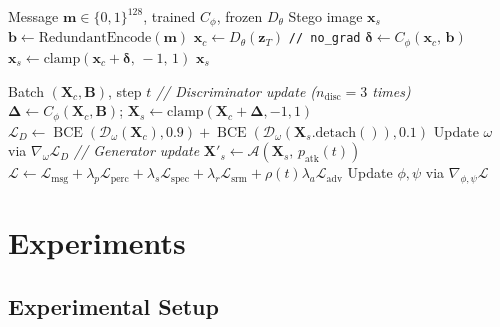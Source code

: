 \documentclass[journal]{IEEEtran}
\newcommand{\Lcal}{\mathcal{L}}
\DeclareMathOperator{\BCE}{BCE}
\begin{document}
\begin{algorithm}[t]
\caption{DSCSP-CA Encoding}
\label{alg:encoding}
\begin{algorithmic}[1]
\REQUIRE Message $\mathbf{m}\!\in\!\{0,1\}^{128}$, trained $C_\phi$, frozen $D_\theta$
\ENSURE Stego image $\mathbf{x}_s$
\STATE $\mathbf{b} \leftarrow \mathrm{RedundantEncode}(\mathbf{m})$
\STATE $\mathbf{x}_c \leftarrow D_\theta(\mathbf{z}_T)$ \quad \texttt{// no\_grad}
\STATE $\bm{\delta} \leftarrow C_\phi(\mathbf{x}_c,\,\mathbf{b})$
\STATE $\mathbf{x}_s \leftarrow \mathrm{clamp}(\mathbf{x}_c + \bm{\delta},\,-1,\,1)$
\RETURN $\mathbf{x}_s$
\end{algorithmic}
\end{algorithm}

\begin{algorithm}[t]
\caption{DSCSP-CA Training Step (Phase 1)}
\label{alg:training}
\begin{algorithmic}[1]
\REQUIRE Batch $(\mathbf{X}_c,\mathbf{B})$, step $t$
\STATE \textit{// Discriminator update ($n_\text{disc}=3$ times)}
    \STATE $\bm{\Delta} \leftarrow C_\phi(\mathbf{X}_c,\mathbf{B})$;\quad
           $\mathbf{X}_s \leftarrow \mathrm{clamp}(\mathbf{X}_c\!+\!\bm{\Delta},-1,1)$
    \STATE $\Lcal_D \leftarrow \BCE(\mathcal{D}_\omega(\mathbf{X}_c),0.9)
                             + \BCE(\mathcal{D}_\omega(\mathbf{X}_s.\mathrm{detach}()),0.1)$
    \STATE Update $\omega$ via $\nabla_\omega\Lcal_D$
\ENDFOR
\STATE \textit{// Generator update}
\STATE $\mathbf{X}'_s \leftarrow \mathcal{A}(\mathbf{X}_s,\,p_\text{atk}(t))$
\STATE $\Lcal \leftarrow \Lcal_\text{msg}+\lambda_p\Lcal_\text{perc}
                        +\lambda_s\Lcal_\text{spec}+\lambda_r\Lcal_\text{srm}
                        +\rho(t)\lambda_a\Lcal_\text{adv}$
\STATE Update $\phi,\psi$ via $\nabla_{\phi,\psi}\Lcal$
\end{algorithmic}
\end{algorithm}


\section{Experiments}
\label{sec:experiments}

\subsection{Experimental Setup}
\label{sec:setup}
\end{document}
